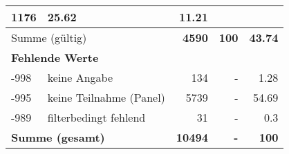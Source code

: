 \begin{longtable}{lXrrr}
       \num{1176} &
       \num[round-mode=places,round-precision=2]{25,62} &
         \num[round-mode=places,round-precision=2]{11,21} \\
     \midrule
     \multicolumn{2}{l}{Summe (gültig)} &
       \textbf{\num{4590}} &
     \textbf{100} &
       \textbf{\num[round-mode=places,round-precision=2]{43,74}} \\
     \multicolumn{5}{l}{\textbf{Fehlende Werte}}\\
       -998 &
       keine Angabe &
         \num{134} &
        - &
         \num[round-mode=places,round-precision=2]{1,28} \\
       -995 &
       keine Teilnahme (Panel) &
         \num{5739} &
        - &
         \num[round-mode=places,round-precision=2]{54,69} \\
       -989 &
       filterbedingt fehlend &
         \num{31} &
        - &
         \num[round-mode=places,round-precision=2]{0,3} \\
     \midrule
     \multicolumn{2}{l}{\textbf{Summe (gesamt)}} &
          \textbf{\num{10494}} &
        \textbf{-} &
        \textbf{100} \\
     \bottomrule
     \end{longtable}
     

